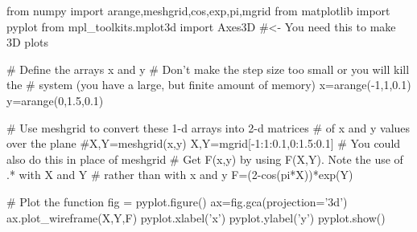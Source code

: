 \begin{codeexample}
\begin{VerbatimOut}{\listingFile}
from numpy import arange,meshgrid,cos,exp,pi,mgrid
from matplotlib import pyplot
from mpl_toolkits.mplot3d import Axes3D  #<- You need this to make 3D plots

# Define the arrays x and y
# Don't make the step size too small or you will kill the
# system (you have a large, but finite amount of memory)
x=arange(-1,1,0.1)
y=arange(0,1.5,0.1)

# Use meshgrid to convert these 1-d arrays into 2-d matrices
# of x and y values over the plane
#X,Y=meshgrid(x,y)
X,Y=mgrid[-1:1:0.1,0:1.5:0.1]  # You could also do this in place of meshgrid
# Get F(x,y) by using F(X,Y). Note the use of .* with X and Y
# rather than with x and y
F=(2-cos(pi*X))*exp(Y)

# Plot the function
fig = pyplot.figure()
ax=fig.gca(projection='3d')
ax.plot_wireframe(X,Y,F)  
pyplot.xlabel('x')
pyplot.ylabel('y')
pyplot.show()
\end{VerbatimOut}
\end{codeexample}


%
%
%
%
%

